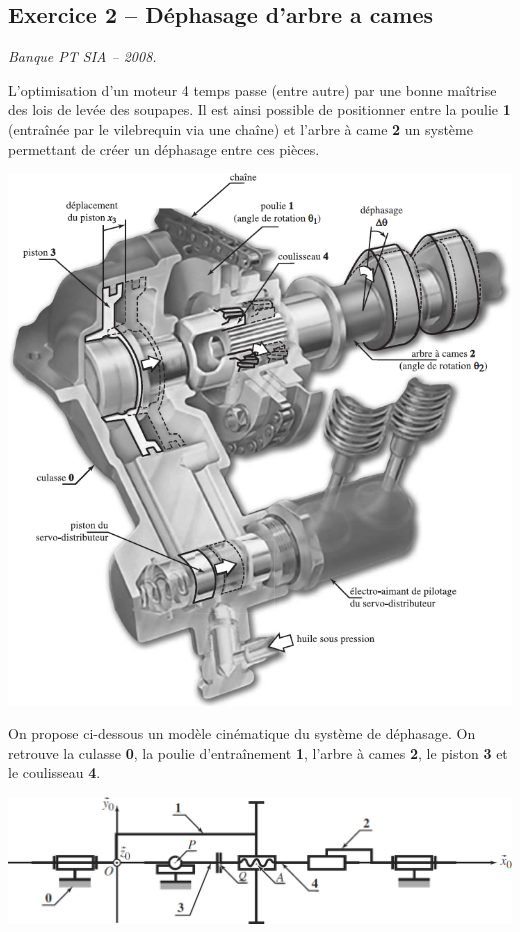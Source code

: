\documentclass[10pt,fleqn]{article} %
\begin{document}
\begin{multicols}{2}
\subsection*{Exercice 2 -- Déphasage d'arbre a cames}
\setcounter{exo}{0}
\begin{flushright}
\textit{Banque PT SIA -- 2008.}
\end{flushright}

L'optimisation d'un moteur 4 temps passe (entre autre) par une bonne maîtrise des lois de levée des soupapes. Il est ainsi possible de positionner entre la poulie \textbf{1} (entraînée par le vilebrequin via une chaîne) et l'arbre à came  \textbf{2} un système permettant de créer un déphasage entre ces pièces. 

\begin{center}
\includegraphics[width=.9\linewidth]{images/calage_1.png}
\end{center}

On propose ci-dessous un modèle cinématique du système de déphasage. On retrouve la culasse \textbf{0}, la poulie d’entraînement \textbf{1}, l'arbre à cames \textbf{2}, le piston \textbf{3} et le coulisseau \textbf{4}. 


\begin{center}
\includegraphics[width=\linewidth]{images/calage_2.png}
\end{center}


\end{multicols}
\end{document}
